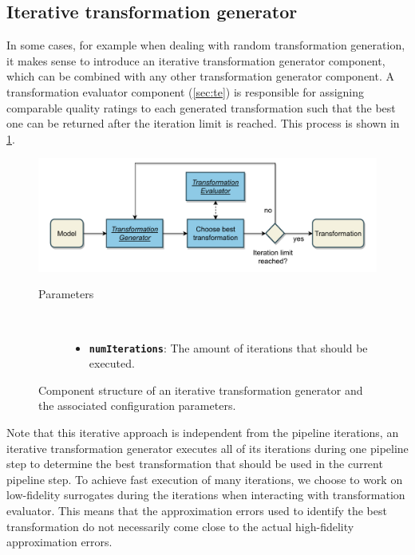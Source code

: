 \documentclass[
  a4paper,  %
  twoside,  %
  bibliography=totoc,
  headsepline,
  cleardoublepage=empty,
  parskip=half,
  draft=false
]{scrbook}
\begin{document}
\newpage

\subsection {Iterative transformation generator}
\label{sec:itg}

In some cases, for example when dealing with random transformation generation, it makes sense to introduce an iterative transformation generator component, which can be combined with any other transformation generator component.
A transformation evaluator component (\cref{sec:te}) is responsible for assigning comparable quality ratings to each generated transformation such that the best one can be returned after the iteration limit is reached.
This process is shown in \cref{fig:itg}.

\begin{mdframed}[style=style,frametitle={Transformation generator (iterative)}]
\begin{figure}[H]
	\includegraphics[width=\textwidth]{graphics/TransformationGen_Iterative.pdf}
\delimit

\begin{description}
\item[Parameters] {~ \begin{itemize}[\null]
\item \texttt{\textbf{numIterations}}: The amount of iterations that should be executed.
\end{itemize}}
\end{description}

\delimit
\caption{Component structure of an iterative transformation generator and the associated configuration parameters.}
\label{fig:itg}
\end{figure}
\end{mdframed}
%
Note that this iterative approach is independent from the pipeline iterations, \ie an iterative transformation generator executes all of its iterations during one pipeline step to determine the best transformation that should be used in the current pipeline step.
To achieve fast execution of many iterations, we choose to work on low-fidelity surrogates during the iterations when interacting with transformation evaluator.
This means that the approximation errors used to identify the best transformation do not necessarily come close to the actual high-fidelity approximation errors.
\end{document}
